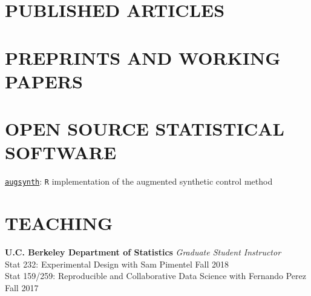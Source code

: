 \documentclass{res}
\begin{document}
\begin{resume}


\section{PUBLISHED ARTICLES}

\hspace{0.2em} 

\vskip -8pt
\section{PREPRINTS AND WORKING PAPERS}

\hspace{0.2em} 
\vskip -8pt
\hspace{0.2em} 
\vskip -8pt
\hspace{0.2em} 
\vskip -8pt
\hspace{0.2em} 
\vskip -8pt
\hspace{0.2em} 

\section{OPEN SOURCE STATISTICAL SOFTWARE}
\hspace{0.2em} \href{https://github.com/ebenmichael/augsynth}{\texttt{augsynth}}: \texttt{R} implementation of the augmented synthetic control method

\section{TEACHING}
\textbf{U.C. Berkeley Department of Statistics}
\textit{Graduate Student Instructor}\\
\hspace{0.2em} Stat 232: Experimental Design with Sam Pimentel \hfill Fall 2018\\
\hspace{0.2em} Stat 159/259: Reproducible and Collaborative Data Science with Fernando Perez \hfill Fall 2017


\end{resume}
\end{document}
